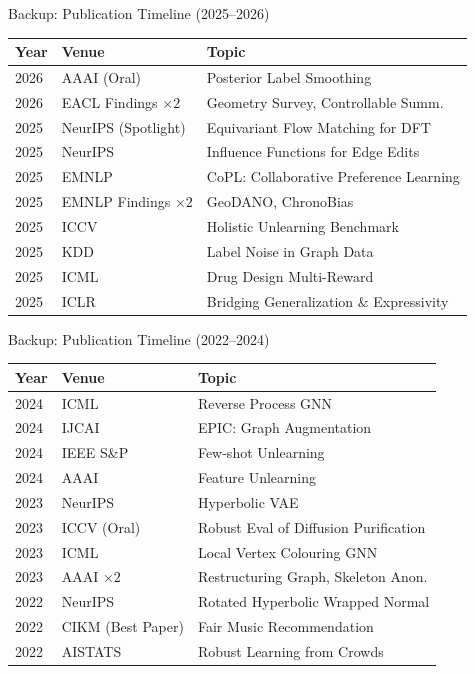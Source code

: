\documentclass[aspectratio=169,11pt]{beamer}
\begin{document}
\appendix

\begin{frame}{Backup: Publication Timeline (2025--2026)}
  \small
  \begin{tabular}{lll}
    \toprule
    \textbf{Year} & \textbf{Venue} & \textbf{Topic} \\
    \midrule
    2026 & AAAI (Oral) & Posterior Label Smoothing \\
    2026 & EACL Findings $\times 2$ & Geometry Survey, Controllable Summ. \\
    2025 & NeurIPS (Spotlight) & Equivariant Flow Matching for DFT \\
    2025 & NeurIPS & Influence Functions for Edge Edits \\
    2025 & EMNLP & CoPL: Collaborative Preference Learning \\
    2025 & EMNLP Findings $\times 2$ & GeoDANO, ChronoBias \\
    2025 & ICCV & Holistic Unlearning Benchmark \\
    2025 & KDD & Label Noise in Graph Data \\
    2025 & ICML & Drug Design Multi-Reward \\
    2025 & ICLR & Bridging Generalization \& Expressivity \\
    \bottomrule
  \end{tabular}
\end{frame}

\begin{frame}{Backup: Publication Timeline (2022--2024)}
  \small
  \begin{tabular}{lll}
    \toprule
    \textbf{Year} & \textbf{Venue} & \textbf{Topic} \\
    \midrule
    2024 & ICML & Reverse Process GNN \\
    2024 & IJCAI & EPIC: Graph Augmentation \\
    2024 & IEEE S\&P & Few-shot Unlearning \\
    2024 & AAAI & Feature Unlearning \\
    2023 & NeurIPS & Hyperbolic VAE \\
    2023 & ICCV (Oral) & Robust Eval of Diffusion Purification \\
    2023 & ICML & Local Vertex Colouring GNN \\
    2023 & AAAI $\times 2$ & Restructuring Graph, Skeleton Anon. \\
    2022 & NeurIPS & Rotated Hyperbolic Wrapped Normal \\
    2022 & CIKM (Best Paper) & Fair Music Recommendation \\
    2022 & AISTATS & Robust Learning from Crowds \\
    \bottomrule
  \end{tabular}
\end{frame}
\end{document}
